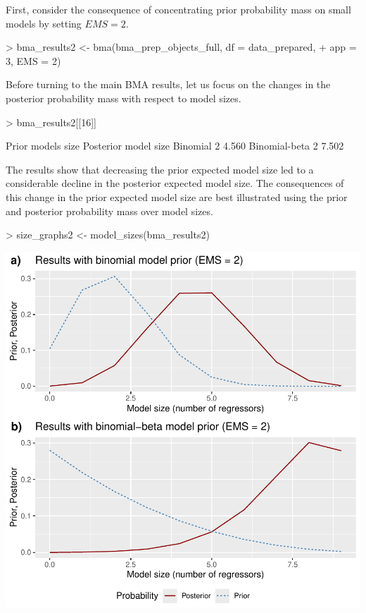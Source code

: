 \documentclass[a4paper]{article}
\begin{document}
First, consider the consequence of concentrating prior probability mass on small models by setting $EMS = 2$.

\begin{Schunk}
\begin{Sinput}
> bma_results2 <- bma(bma_prep_objects_full, df = data_prepared,
+                     app = 3, EMS = 2)
\end{Sinput}
\end{Schunk}

\noindent Before turning to the main BMA results, let us focus on the changes in the posterior probability mass with respect to model sizes.

\begin{Schunk}
\begin{Sinput}
> bma_results2[[16]]
\end{Sinput}
\begin{Soutput}
              Prior models size Posterior model size
Binomial                      2                4.560
Binomial-beta                 2                7.502
\end{Soutput}
\end{Schunk}

\noindent The results show that decreasing the prior expected model size led to a considerable decline in the posterior expected model size.
The consequences of this change in the prior expected model size are best illustrated using the prior and posterior probability mass over model sizes.

\begin{Schunk}
\begin{Sinput}
> size_graphs2 <- model_sizes(bma_results2)
\end{Sinput}
\end{Schunk}
\includegraphics{bdsm_vignette-028}
\end{document}
